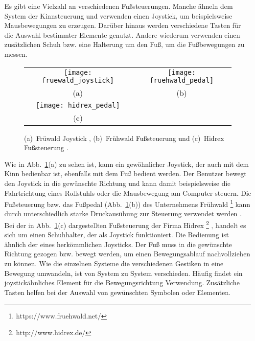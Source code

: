 Es gibt eine Vielzahl an verschiedenen Fußsteuerungen. Manche ähneln dem System der Kinnsteuerung und verwenden einen Joystick, um beispielsweise Mausbewegungen zu erzeugen. Darüber hinaus werden verschiedene Tasten für die Auswahl bestimmter Elemente genutzt. Andere wiederum verwenden einen zusätzlichen Schuh bzw. eine Halterung um den Fuß, um die Fußbewegungen zu messen.
%
%
\begin{figure}
\centering\small
\setlength{\tabcolsep}{0mm}	%
\begin{tabular}{c@{\hspace{0mm}}c} %
  \texttt{[image: fruewald\_joystick]} &
  \texttt{[image: fruehwald\_pedal]}
\\
  (a) & (b)
\\[7pt]	%
  \texttt{[image: hidrex\_pedal]}
\\
  (c)
\end{tabular}
%
\caption{(a)~Früwald Joystick \cite{FRUEHWALD}, (b)~Frühwald Fußsteuerung \cite{FRUEHWALD} und (c)~Hidrex Fußsteuerung \cite{HIDREX}.}
\label{fig:foot}
\end{figure}
%
%
\newline \newline
Wie in Abb.~\ref{fig:foot}(a) zu sehen ist, kann ein gewöhnlicher Joystick, der auch mit dem Kinn bedienbar ist, ebenfalls mit dem Fuß bedient werden. Der Benutzer bewegt den Joystick in die gewünschte Richtung und kann damit beispielsweise die Fahrtrichtung eines Rollstuhls oder die Mausbewegung am Computer steuern. Die Fußsteuerung bzw. das Fußpedal (Abb.~\ref{fig:foot}(b)) des Unternehmens Frühwald%
\footnote{https://www.fruehwald.net/}
%
kann durch unterschiedlich starke Druckausübung zur Steuerung verwendet werden \cite{FRUEHWALD}. 
\newline \newline
Bei der in Abb.~\ref{fig:foot}(c) dargestellten Fußsteuerung der Firma Hidrex %
\footnote{http://www.hidrex.de/}%
, handelt es sich um einen Schuhhalter, der als Joystick funktioniert. Die Bedienung ist ähnlich der eines herkömmlichen Joysticks. Der Fuß muss in die gewünschte Richtung gezogen bzw. bewegt werden, um einen Bewegungsablauf nachvollziehen zu können.
%
\newline \newline
Wie die einzelnen Systeme die verschiedenen Gestiken in eine Bewegung umwandeln, ist von System zu System verschieden. Häufig findet ein joystickähnliches Element für die Bewegungsrichtung Verwendung. Zusätzliche Tasten helfen bei der Auswahl von gewünschten Symbolen oder Elementen.

